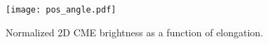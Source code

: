 

\begin{figure}[!t]
\begin{center}
\texttt{[image: pos\_angle.pdf]}
\caption[Electron brightness as function of angle]{Normalized 2D CME brightness as a function of elongation.}
\label{fig:pos_angle}
\end{center}
\end{figure}



